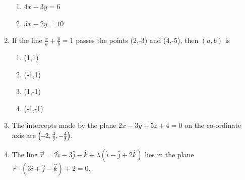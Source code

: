 \begin{enumerate}[label=\thesubsection.\arabic*,ref=\thesubsection.\theenumi]
\begin{enumerate}
\item $4x-3y=6$
\item $5x-2y=10$
\end{enumerate}
\item If the line $\frac{x}{a}+\frac{y}{b}=1$ passes the points (2,-3) and (4,-5), then $(a,b)$ is 
\begin{enumerate}
\item (1,1)
\item (-1,1)
\item (1,-1)
\item (-1,-1)
\end{enumerate}
\item The intercepts made by the plane $2x-3y+5z+4=0$ on the co-ordinate axis are $\left(-2,\frac{4}{3},-\frac{4}{5}\right)$.
\item The line $\overrightarrow{r}=2\hat{i}-3\hat{j}-\hat{k}+\lambda(\hat{i}-\hat{j}+2\hat{k})$ lies in the plane $\overrightarrow{r} \cdot (3\hat{i}+\hat{j}-\hat{k})+2=0$.
\end{enumerate}
